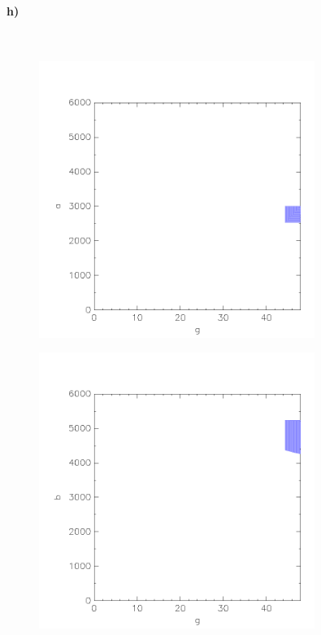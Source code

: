\paragraph{h)}\mbox{} \\

\begin{minipage}[t]{0.5\textwidth} 
	\begin{figure}[H]
		\centering
		\includegraphics[width=0.8\textwidth]{Aufgabe_h1).png}
	\end{figure}
\end{minipage}
\hfill
\begin{minipage}[t]{0.5\textwidth} 
	\begin{figure}[H]
		\centering
		\includegraphics[width=0.8\textwidth]{Aufgabe_h2).png}
	\end{figure}
\end{minipage}

